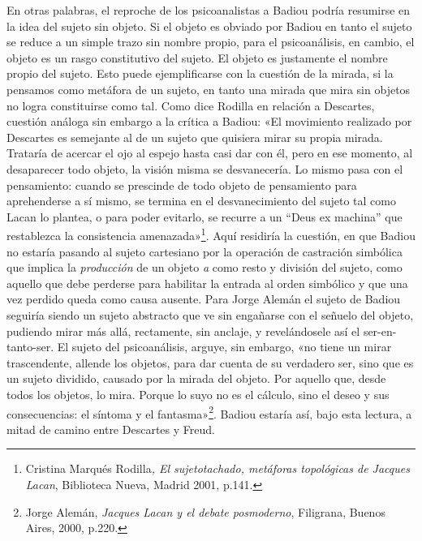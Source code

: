 En otras palabras, el reproche de los psicoanalistas a Badiou podría resumirse en la idea del sujeto sin objeto. Si el objeto es obviado por Badiou en tanto el sujeto se reduce a un simple trazo sin nombre propio, para el psicoanálisis, en cambio, el objeto es un rasgo constitutivo del sujeto. El objeto es justamente el nombre propio del sujeto. Esto puede ejemplificarse con la cuestión de la mirada, si la pensamos como metáfora de un sujeto, en tanto una mirada que mira sin objetos no logra constituirse como tal. Como dice Rodilla en relación a Descartes, cuestión análoga sin embargo a la crítica a Badiou: «El movimiento realizado por Descartes es semejante al de un sujeto que quisiera mirar su propia mirada. Trataría de acercar el ojo al espejo hasta casi dar con él, pero en ese momento, al desaparecer todo objeto, la visión misma se desvanecería. Lo mismo pasa con el pensamiento: cuando se prescinde de todo objeto de pensamiento para aprehenderse a sí mismo, se termina en el desvanecimiento del sujeto tal como Lacan lo plantea, o para poder evitarlo, se recurre a un ``Deus ex machina'' que restablezca la consistencia amenazada»\footnote{Cristina Marqués Rodilla\emph{, El sujetotachado, metáforas topológicas de Jacques Lacan}, Biblioteca Nueva, Madrid 2001, p.141.}. Aquí residiría la cuestión, en que Badiou no estaría pasando al sujeto cartesiano por la operación de castración simbólica que implica la \emph{producción} de un objeto \emph{a} como resto y división del sujeto, como aquello que debe perderse para habilitar la entrada al orden simbólico y que una vez perdido queda como causa ausente. Para Jorge Alemán el sujeto de Badiou seguiría siendo un sujeto abstracto que ve sin engañarse con el señuelo del objeto, pudiendo mirar más allá, rectamente, sin anclaje, y revelándosele así el ser-en-tanto-ser. El sujeto del psicoanálisis, arguye, sin embargo, «no tiene un mirar trascendente, allende los objetos, para dar cuenta de su verdadero ser, sino que es un sujeto dividido, causado por la mirada del objeto. Por aquello que, desde todos los objetos, lo mira. Porque lo suyo no es el cálculo, sino el deseo y sus consecuencias: el síntoma y el fantasma»\footnote{Jorge Alemán, \emph{Jacques Lacan y el debate posmoderno}, Filigrana, Buenos Aires, 2000, p.220.}. Badiou estaría así, bajo esta lectura, a mitad de camino entre Descartes y Freud.

